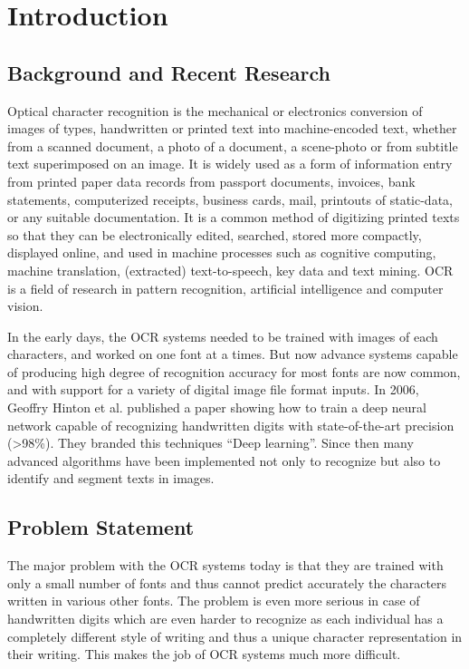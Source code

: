 \chapter{Introduction}

\section{Background and Recent Research}
Optical character recognition is the mechanical or electronics conversion of images of types, handwritten or printed text into machine-encoded text, whether from a scanned document, a photo of a document, a scene-photo or from subtitle text superimposed on an image. It is widely used as a form of information entry from printed paper data records from passport documents, invoices, bank statements, computerized receipts, business cards, mail, printouts of static-data, or any suitable documentation. It is a common method of digitizing printed texts so that they can be electronically edited, searched, stored more compactly, displayed online, and used in machine processes such as cognitive computing, machine translation, (extracted) text-to-speech, key data and text mining. OCR is a field of research in pattern recognition, artificial intelligence and computer vision.

In the early days, the OCR systems needed to be trained with images of each characters, and worked on one font at a times. But now advance systems capable of producing high degree of recognition accuracy for most fonts are now common, and with support for a variety of digital image file format inputs. In 2006, Geoffry Hinton et al. published a paper \autocite{bengio2009learning} showing how to train a deep neural network capable of recognizing handwritten digits with state-of-the-art precision (>98\%). They branded this techniques “Deep learning”. Since then many advanced algorithms have been implemented not only to recognize but also to identify and segment texts in images. 

\section{Problem Statement}
The major problem with the OCR systems today is that they are trained with only a small number of fonts and thus cannot predict accurately the characters written in various other fonts. The problem is even more serious in case of handwritten digits which are even harder to recognize as each individual has a completely different style of writing and thus a unique character representation in their writing. This makes the job of OCR systems much more difficult. 

